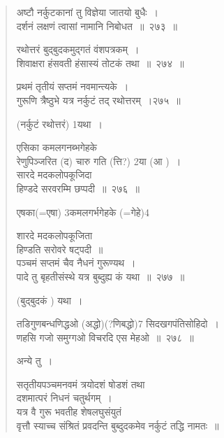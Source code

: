 \documentclass[11pt, openany]{book}
\begin{document}
\begin{quote}
{\na अष्टौ नर्कुटकानां तु विज्ञेया जातयो बुधैः~।\\
दर्शनं लक्षणं त्वासां नामानि निबोधत~॥~२७३~॥ 

रथोत्तरं बुद्बुदकमुद्गतं वंशपत्रकम्~।\\ 
शिवाक्षरा हंसवती हंसास्यं तोटकं तथा~॥~२७४~॥

प्रथमं तृतीयं सप्तमं नवमान्त्यके~।\\
गुरूणि त्रैष्ठुभे यत्र नर्कुटं तद् रथोत्तरम्~।२७५~॥}

(नर्कुटं रथोत्तरं) 1यथा~।

{\na एसिका कमलगनब्भगेहके \\
 रेणुपिञ्जरित (द) चारु गति (त्ति?) 2या (आ )~। \\
सारदे मदकलोपकूजिदा\\
 हिण्डदे सरवरम्मि छप्पदी~॥~२७६~॥}

एषका(=एषा) 3कमलगर्भगेहके (=गेहे)4 

{\na शारदे मदकलोपकूजिता \\
 हिण्डति सरोवरे षट्पदी~॥\\
पञ्चमं सप्तमं चैव नैधनं गुरूण्यथ~। \\
पादे तु बृहतीसंस्थे यत्र बुब्दुह्य कं यथा~॥~२७७~॥}

(बुद्बुदकं ) यथा~। 

{\na तडिगुणबन्धणिद्धओ (अद्धो)(?णिबद्धो)7 सिदखगपंतिसोहिदो~।\\
णहसि गजो समुग्गओ विचरदि एस मेहओ~॥~२७८~॥}

{ }

अन्ये तु~। 

{\na सतृतीयपञ्चमनवमं त्रयोदशं षोडशं तथा\\ 
दशमात्परं निधनं चतुर्थगम्~।\\ 
यत्र वै गुरू भवतीह शेषलघुसंयुतं \\
वृत्तौ स्याच्च संश्रितं प्रवदन्ति बुब्दुदकमेव नर्कुटं तद्धि नामतः~॥}
\end{quote}


\newpage
\end{document}
